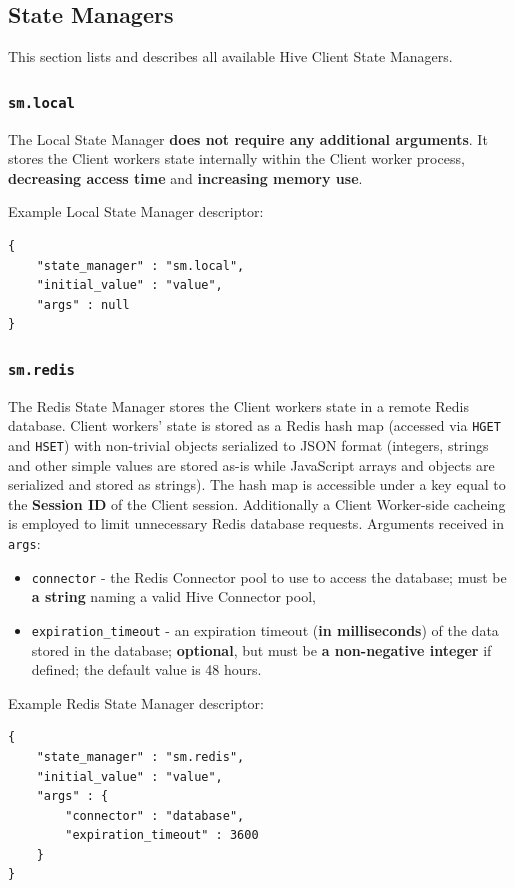 \documentclass[a4paper]{article}
\begin{document}
\subsection{State Managers}
\label{sec-9-5}
\label{ref-state_managers}

This section lists and describes all available Hive Client State Managers.
\subsubsection{\texttt{sm.local}}
\label{sec-9-5-1}

The Local State Manager \textbf{does not require any additional arguments}. It stores the Client workers state internally within the Client worker process, \textbf{decreasing access time} and \textbf{increasing memory use}.

\noindent
Example Local State Manager descriptor:

\begin{verbatim}
{
    "state_manager" : "sm.local",
    "initial_value" : "value",
    "args" : null
}
\end{verbatim}
\subsubsection{\texttt{sm.redis}}
\label{sec-9-5-2}

The Redis State Manager stores the Client workers state in a remote Redis database. Client workers' state is stored as a Redis hash map (accessed via \texttt{HGET} and \texttt{HSET}) with non-trivial objects serialized to JSON format (integers, strings and other simple values are stored as-is while JavaScript arrays and objects are serialized and stored as strings). The hash map is accessible under a key equal to the \textbf{Session ID} of the Client session. Additionally a Client Worker-side cacheing is employed to limit unnecessary Redis database requests. Arguments received in \texttt{args}:


\begin{itemize}
\item \texttt{connector} - the Redis Connector pool to use to access the database; must be \textbf{a string} naming a valid Hive Connector pool,
\item \texttt{expiration\_timeout} - an expiration timeout (\textbf{in milliseconds}) of the data stored in the database; \textbf{optional}, but must be \textbf{a non-negative integer} if defined; the default value is 48 hours.
\end{itemize}

\noindent
Example Redis State Manager descriptor:

\begin{verbatim}
{
    "state_manager" : "sm.redis",
    "initial_value" : "value",
    "args" : {
        "connector" : "database",
        "expiration_timeout" : 3600
    }
}
\end{verbatim}
\end{document}
